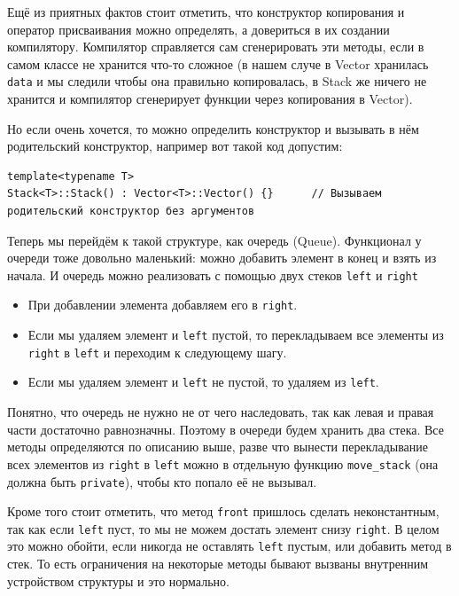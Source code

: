 Ещё из приятных фактов стоит отметить, что конструктор копирования и оператор присваивания можно определять, а довериться в их создании компилятору. Компилятор справляется сам сгенерировать эти методы, если в самом классе не хранится что-то сложное (в нашем случе в Vector хранилась \texttt{data} и мы следили чтобы она правильно копировалась, в Stack же ничего не хранится и компилятор сгенерирует функции через копирования в Vector).

Но если очень хочется, то можно определить конструктор и вызывать в нём родительский конструктор, например вот такой код допустим:
\begin{verbatim}
template<typename T>
Stack<T>::Stack() : Vector<T>::Vector() {}      // Вызываем родительский конструктор без аргументов
\end{verbatim}


Теперь мы перейдём к такой структуре, как очередь (Queue). Функционал у очереди тоже довольно маленький: можно добавить элемент в конец и взять из начала. И очередь можно реализовать с помощью двух стеков \texttt{left} и \texttt{right}
\begin{itemize}
    \item При добавлении элемента добавляем его в \texttt{right}.
    \item Если мы удаляем элемент и \texttt{left} пустой, то перекладываем все элементы из \texttt{right} в \texttt{left} и переходим к следующему шагу.
    \item Если мы удаляем элемент и \texttt{left} не пустой, то удаляем из \texttt{left}.
\end{itemize}

Понятно, что очередь не нужно не от чего наследовать, так как левая и правая части достаточно равнозначны. Поэтому в очереди будем хранить два стека. Все методы определяются по описанию выше, разве что вынести перекладывание всех элементов из \texttt{right} в \texttt{left} можно в отдельную функцию \texttt{move_stack} (она должна быть \texttt{private}), чтобы кто попало её не вызывал.

Кроме того стоит отметить, что метод \texttt{front} пришлось сделать неконстантным, так как если \texttt{left} пуст, то мы не можем достать элемент снизу \texttt{right}. В целом это можно обойти, если никогда не оставлять \texttt{left} пустым, или добавить метод в стек. То есть ограничения на некоторые методы бывают вызваны внутренним устройством структуры и это нормально.
